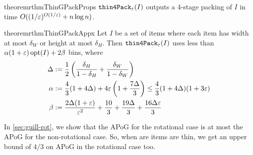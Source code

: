 \begin{restatable}{theorem}{rthmThinGPackProps}
\label{thm:thin-gpack-props}
$\operatorname{\mathtt{thin4Pack}}_{\varepsilon}(I)$ outputs a 4-stage packing of $I$ in time
$O((1/\varepsilon)^{O(1/\varepsilon)} + n\log n)$.
\end{restatable}

\begin{restatable}{theorem}{rthmThinGPackAppx}
\label{thm:thin-gpack-appx}
Let $I$ be a set of items where each item has width at most $\delta_W$
or height at most $\delta_H$. Then $\operatorname{\mathtt{thin4Pack}}_{\varepsilon}(I)$ uses less than
$\alpha(1+\varepsilon)\operatorname{opt}(I) + 2\beta$ bins, where
\begin{align*}
\Delta &:= \frac{1}{2}\left(\frac{\delta_H}{1-\delta_H}
    + \frac{\delta_W}{1-\delta_W}\right)
\\ \alpha &:= \frac{4}{3}(1+4\Delta) + 4\varepsilon\left(1 + \frac{7\Delta}{3}\right)
    \le \frac{4}{3}(1+4\Delta)(1+3\varepsilon)
\\ \beta &:= \frac{2\Delta(1+\varepsilon)}{\varepsilon^2} + \frac{10}{3}
    + \frac{19\Delta}{3} + \frac{16\Delta\varepsilon}{3}
\end{align*}
\end{restatable}

In \cref{sec:guill-rot}, we show that the APoG for the rotational case
is at most the APoG for the non-rotational case.
So, when are items are thin, we get an upper bound of $4/3$ on APoG
in the rotational case too.
